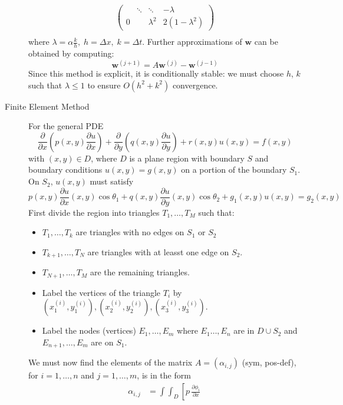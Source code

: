\documentclass[8pt]{article}
\begin{document}
\begin{multicols}{2}
\begin{description}
\begin{equation*}
\begin{aligned}
\begin{pmatrix}
            & \ddots & \ddots & -\lambda\\
            0 & & \lambda^2 & 2(1-\lambda^2)
          \end{pmatrix} \\
      \end{aligned}
    \end{equation*}
    where $\lambda=\alpha\frac{k}{h},\;h=\Delta x,\;k=\Delta
    t$. Further approximations of $\mathbf{w}$ can be obtained by
    computing:
    $$ \mathbf{w}^{(j+1)} = A \mathbf{w}^{(j)} - \mathbf{w}^{(j-1)}$$
    Since this method is explicit, it is conditionally stable: we must
    choose $h$, $k$ such that $\lambda\leq1$ to ensure $O(h^2+k^2)$
    convergence.
  \item[Finite Element Method] For the general PDE
    $$ \frac{\partial}{\partial x}\left(p(x,y)\frac{\partial u}{\partial x}\right) + 
    \frac{\partial}{\partial y}\left(q(x,y)\frac{\partial u}{\partial y}\right) +
    r(x,y)u(x,y)=f(x,y)$$
    with $(x,y) \in D$, where $D$ is a plane region with boundary $S$
    and boundary conditions $u(x,y)=g(x,y)$ on a portion of the
    boundary $S_1$. On $S_2$, $u(x,y)$ must satisfy 
    $$ p(x,y)\frac{\partial u}{\partial x}(x,y)\cos\theta_1 +
    q(x,y)\frac{\partial u}{\partial y}(x,y)\cos\theta_2 +
    g_1(x,y)u(x,y) = g_2(x,y)$$
    First divide the region into triangles $T_1,\ldots,T_M$ such that:
    \begin{itemize}
    \item $T_1,\ldots,T_k$ are triangles with no edges on $S_1$ or $S_2$
    \item $T_{k+1},\ldots,T_N$ are triangles with at leasst one edge
      on $S_2$.
    \item $T_{N+1},\ldots,T_M$ are the remaining triangles.
    \item Label the vertices of the triangle $T_i$ by
      $(x_1^{(i)},y_1^{(i)}), (x_2^{(i)},y_2^{(i)}), (x_3^{(i)},y_3^{(i)})$.
    \item Label the nodes (vertices) $E_1,\ldots,E_m$ where
      $E_1\ldots,E_n$ are in $D \cup S_2$ and $E_{n+1},\ldots,E_m$
      are on $S_1$.
    \end{itemize}
    We must now find the elements of the matrix $A = (\alpha_{i,j})$
    (sym, pos-def), for $i=1,\ldots,n$ and $j=1,\ldots,m$, is in the form
    \begin{equation*}
      \begin{aligned}
        \alpha_{i,j} &=
        \int\int_{D}\left[
          p \,
          \frac{\partial\phi_i}{\partial x} \,

\end{aligned}
\end{equation*}
\end{description}
\end{multicols}
\end{document}

